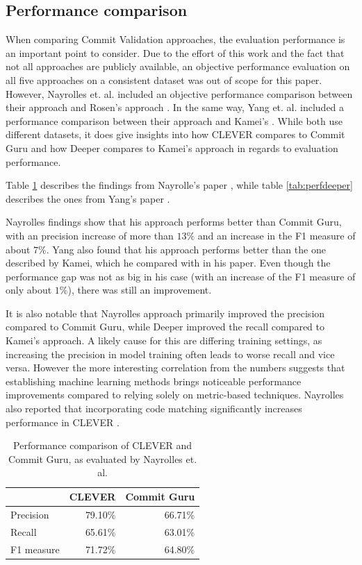 \subsection{Performance comparison}

When comparing Commit Validation approaches, the evaluation performance is an important point to consider. Due to the effort of this work and the fact that not all approaches are publicly available, an objective performance evaluation on all five approaches on a consistent dataset was out of scope for this paper. However, Nayrolles et. al. included an objective performance comparison between their approach and Rosen's approach \cite{Nayrolles2018}. In the same 
way, %
Yang et. al. included a performance comparison between their approach and Kamei's \cite{Yang2015}. While both use different datasets, it does give insights into how CLEVER compares to Commit Guru and how Deeper compares to Kamei's approach in regards to evaluation performance.

Table \ref{tab:perfclever} describes the findings from Nayrolle's paper \cite{Nayrolles2018}, while table \ref{tab:perfdeeper} describes the ones from Yang's paper \cite{Yang2015}.

Nayrolles findings show that his approach performs better than Commit Guru, with an precision increase of more than $13\%$ and an increase in the F1 measure of about $7\%$. Yang also found that his approach performs better than the one described by Kamei, which he compared with in his paper. Even though the performance gap was not as big in his case (with an increase of the F1 measure of only about $1\%$), there was still an improvement. 

It is also notable that Nayrolles approach primarily improved the precision compared to Commit Guru, while Deeper improved the recall compared to Kamei's approach. A likely cause for this are differing training settings, as increasing the precision in model training often leads to worse recall and vice versa. However the more interesting correlation from the numbers suggests that establishing machine learning methods brings noticeable performance improvements compared to relying solely on metric-based techniques. Nayrolles also reported that incorporating code matching significantly increases performance in CLEVER \cite{Nayrolles2018}.

\begin{table}[t]
	\centering
	\caption{Performance comparison of CLEVER and Commit Guru, as evaluated by Nayrolles et. al. \cite{Nayrolles2018}}
	\begin{tabular}{@{}lrr@{}}
		\toprule
		& \multicolumn{1}{l}{CLEVER} & \multicolumn{1}{l}{Commit Guru} \\ \midrule
		Precision  & 79.10\%                    & 66.71\%                         \\
		Recall     & 65.61\%                    & 63.01\%                         \\
		F1 measure & 71.72\%                    & 64.80\%                         \\ \bottomrule
	\end{tabular}
	\label{tab:perfclever}
\end{table}

